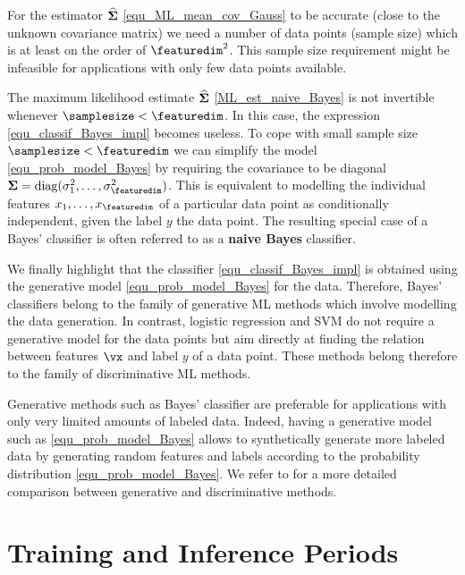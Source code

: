 \documentclass[12pt]{report}
\begin{document}
For the estimator $\widehat{\bf \Sigma}$ \eqref{equ_ML_mean_cov_Gauss} 
to be accurate (close to the unknown covariance matrix) we need a number 
of data points (sample size) which is at least on the order of $\featuredim^{2}$. 
This sample size requirement might be infeasible for applications with only few 
data points available. 

The maximum likelihood estimate $\widehat{\bf \Sigma}$ \eqref{ML_est_naive_Bayes} 
is not invertible whenever $\samplesize < \featuredim$. In this case, the expression 
\eqref{equ_classif_Bayes_impl} becomes useless. To cope with small sample size 
$\samplesize < \featuredim$ we can simplify the model \eqref{equ_prob_model_Bayes} 
by requiring the covariance to be diagonal ${\bf \Sigma} = {\rm diag} (\sigma_{1}^{2}, \ldots, \sigma_{\featuredim}^{2})$. 
This is equivalent to modelling the individual features $x_{1},\ldots,x_{\featuredim}$ 
of a particular data point as conditionally independent, given the label $y$ the data 
point. The resulting special case of a Bayes' classifier is often referred to as a 
{\bf naive Bayes} classifier. 

We finally highlight that the classifier \eqref{equ_classif_Bayes_impl} 
is obtained using the generative model \eqref{equ_prob_model_Bayes} 
for the data. Therefore, Bayes' classifiers belong to the family of generative 
ML methods which involve modelling the data generation. In contrast, 
logistic regression and SVM do not require a generative model for the 
data points but aim directly at finding the relation between features $\vx$ 
and label $y$ of a data point. These methods belong therefore to the 
family of discriminative ML methods. 


Generative methods such as Bayes' classifier are preferable for 
applications with only very limited amounts of labeled data. Indeed, 
having a generative model such as \eqref{equ_prob_model_Bayes} 
allows to synthetically generate more labeled data by generating 
random features and labels according to the probability distribution 
\eqref{equ_prob_model_Bayes}. We refer to \cite{NIPS2001_2020} 
for a more detailed comparison between generative and discriminative 
methods. 




\section{Training and Inference Periods} 
\label{sec_training_inference} 
\end{document}
